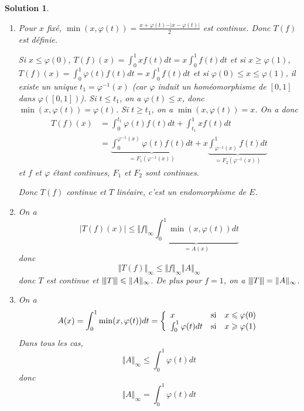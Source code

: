 \documentclass[12pt]{article}
\newtheorem{solution}{Solution}[section]
\theoremstyle{remark}
\newcommand{\vertiii}[1]{{\left\vert\kern-0.25ex\left\vert\kern-0.25ex\left\vert{}#1
\right\vert\kern-0.25ex\right\vert\kern-0.25ex\right\vert}}
\begin{document}
\begin{solution}
	\phantom{}
	\begin{enumerate}
		\item Pour $x$ fixé, $\min(x,\varphi(t))=\frac{x+\varphi(t)-\vert x-\varphi(t)\vert}{2}$ est continue. Donc $T(f)$ est définie.
		
		Si $x\leqslant\varphi(0)$, $T(f)(x)=\int_{0}^{1}xf(t)dt=x\int_{0}^{1}f(t)dt$ et si $x\geqslant\varphi(1)$, $T(f)(x)=\int_{0}^{1}\varphi(t)f(t)dt=x\int_{0}^{1}f(t)dt$ et si $\varphi(0)\leqslant x\leqslant\varphi(1)$, il existe un unique $t_{1}=\varphi^{-1}(x)$ (car $\varphi$ induit un homéomorphisme de $[0,1]$ dans $\varphi([0,1])$). Si $t\leqslant t_{1}$, on a $\varphi(t)\leqslant x$, donc $\min(x,\varphi(t))=\varphi(t)$. Si $t\geqslant t_{1}$, on a $\min(x,\varphi(t))=x$. On a donc 
		\begin{align*}
			T(f)(x)
			&=\int_{0}^{t_{1}}\varphi(t)f(t)dt+\int_{t_{1}}^{1}xf(t)dt\\
			&=\underbrace{\int_{0}^{\varphi^{-1}(x)}\varphi(t)f(t)dt}_{=F_{1}(\varphi^{-1}(x))}+x\underbrace{\int_{\varphi^{-1}(x)}^{1}f(t)dt}_{=F_{2}(\varphi^{-1}(x))}
		\end{align*}
		et $f$ et $\varphi$ étant continues, $F_{1}$ et $F_{2}$ sont continues.

		Donc $T(f)$ continue et $T$ linéaire, c'est un endomorphisme de $E$.

		\item On a 
		\begin{equation*}
			\vert T(f)(x)\vert\leqslant\Vert f\Vert_{\infty}\underbrace{\int_{0}^{1}\min(x,\varphi(t))dt}_{=A(x)}
		\end{equation*}
		donc 
		$$\Vert T(f)\Vert_{\infty}\leqslant\Vert f\Vert_{\infty}\Vert A\Vert_{\infty}$$
		donc $T$ est continue et $\vertiii{T}\leqslant\Vert A\Vert_{\infty}$. De plus pour $f=1$, on a $\vertiii{T}=\Vert A\Vert_{\infty}$.

		\item On a 
		$$
		A(x)=\int_{0}^{1}\min(x,\varphi(t))dt=
		\left\{
			\begin{array}[]{lll}
				x & \text{si} & x\leqslant\varphi(0)\\
				\int_{0}^{1}\varphi(t)dt & \text{si} & x\geqslant\varphi(1)
			\end{array}
		\right.
		$$
		Dans tous les cas, 
		$$\Vert A\Vert_{\infty}\leqslant\int_{0}^{1}\varphi(t)dt$$
		donc 
		$$\Vert A\Vert_{\infty}=\int_{0}^{1}\varphi(t)dt$$
	\end{enumerate}
\end{solution}
\end{document}
